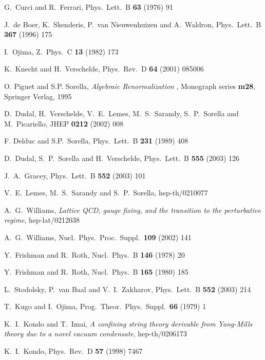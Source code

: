 \documentclass[a4paper,12pt]{article}
\begin{document}
\begin{thebibliography}{99}
  G.~Curci and R.~Ferrari, Phys.\ Lett.\ B \textbf{63}
(1976) 91

  J.~de Boer, K.~Skenderis, P.~van Nieuwenhuizen and
A.~Waldron, Phys.\ Lett.\ B \textbf{367} (1996) 175

  I.~Ojima, Z.\ Phys.\ C \textbf{13} (1982) 173

  K.~Knecht and H.~Verschelde, Phys.\ Rev.\ D \textbf{%
64} (2001) 085006

  O. Piguet and S.P. Sorella, \emph{Algebraic Renormalization}%
, Monograph series \textbf{m28}, Springer Verlag, 1995

  D.~Dudal, H.~Verschelde, V.~E.~Lemes, M.~S.~Sarandy, S.~P.~Sorella
and M.~Picariello, JHEP \textbf{0212} (2002) 008

  F. Delduc and S.P.\ Sorella, Phys.\ Lett.\ B \textbf{231}
(1989) 408

  D.~Dudal, S.~P.~Sorella and H.~Verschelde, Phys.\
Lett.\ B \textbf{555} (2003) 126

  J.~A.~Gracey, Phys.\ Lett.\ B \textbf{552} (2003)
101

  V.~E.~Lemes, M.~S.~Sarandy and S.~P.~Sorella,
hep-th/0210077

  A.~G.~Williams, \emph{Lattice QCD, gauge fixing, and the transition to the perturbative  regime}, hep-lat/0212038

  A.~G.~Williams, Nucl.\ Phys.\ Proc.\ Suppl.\
\textbf{109} (2002) 141

  Y.~Frishman and R.~Roth, Nucl.\ Phys.\ B \textbf{%
146} (1978) 20

  Y.~Frishman and R.~Roth, Nucl.\ Phys.\ B \textbf{165}
(1980) 185

  L.~Stodolsky, P.~van Baal and V.~I.~Zakharov,
Phys.\ Lett.\ B \textbf{552} (2003) 214

  T.~Kugo and I.~Ojima, Prog.\ Theor.\ Phys.\ Suppl.\
\textbf{66} (1979) 1

\bibitem{Kondo:2002xn}  K.~I.~Kondo and T.~Imai, \emph{A confining string theory derivable from Yang-Mills theory due to a  novel vacuum condensate}, hep-th/0206173

  K.~I.~Kondo, Phys.\ Rev.\ D \textbf{57} (1998) 7467


\end{thebibliography}
\end{document}
